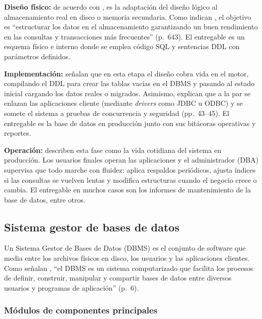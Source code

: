 \textbf{Diseño físico:} de acuerdo con \textcites[p.~43]{date_intro_bd}[p.~37]{elmasri_navathe}, es la adaptación del diseño lógico al almacenamiento real en disco o memoria secundaria. Como indican \textcite{elmasri_navathe}, el objetivo es \enquote{estructurar los datos en el almacenamiento garantizando un buen rendimiento en las consultas y transacciones más frecuentes} (p.~643). El entregable es un esquema físico e interno donde se emplea código SQL y sentencias DDL con parámetros definidos.

\textbf{Implementación:} \textcites[p.~41]{date_intro_bd}[p.~31]{elmasri_navathe} señalan que en esta etapa el diseño cobra vida en el motor, compilando el DDL para crear las tablas vacías en el DBMS y pasando al estado inicial cargando los datos reales o migrados. Asimismo, \textcite{elmasri_navathe} explican que a la par se enlazan las aplicaciones cliente (mediante \textit{drivers} como JDBC u ODBC) y se somete el sistema a pruebas de concurrencia y seguridad (pp.~43--45). El entregable es la base de datos en producción junto con sus bitácoras operativas y reportes.

\textbf{Operación:} \textcites[p.~42]{date_intro_bd}[pp.~15, 45]{elmasri_navathe} describen esta fase como la vida cotidiana del sistema en producción. Los usuarios finales operan las aplicaciones y el administrador (DBA) supervisa que todo marche con fluidez: aplica respaldos periódicos, ajusta índices si las consultas se vuelven lentas y modifica estructuras cuando el negocio crece o cambia. El entregable en muchos casos son los informes de mantenimiento de la base de datos, entre otros.

\subsection{Sistema gestor de bases de datos}

Un Sistema Gestor de Bases de Datos (DBMS) es el conjunto de software que media entre los archivos físicos en disco, los usuarios y las aplicaciones clientes. Como señalan \textcite{elmasri_navathe}, \enquote{el DBMS es un sistema computarizado que facilita los procesos de definir, construir, manipular y compartir bases de datos entre diversos usuarios y programas de aplicación} (p.~6).

\subsubsection{Módulos de componentes principales}

